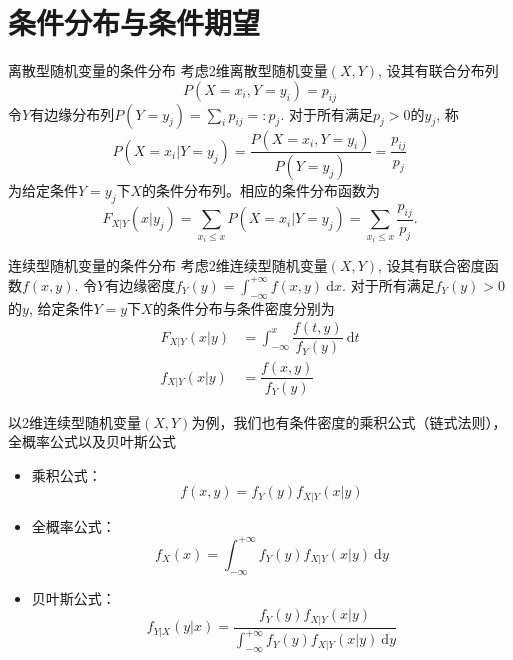 \section{条件分布与条件期望}


\begin{frame}

\begin{block}{离散型随机变量的条件分布}
考虑2维离散型随机变量$(X,Y)$, 设其有联合分布列
\[P(X=x_i, Y = y_i) = p_{ij}\]
令$Y$有边缘分布列$P(Y = y_j) = \sum\limits_{i} p_{ij} =: p_j$. 对于所有满足$p_j > 0$的$y_j$, 称
\[P(X = x_i | Y = y_j) = \dfrac{P(X=x_i, Y = y_i)}{P(Y = y_j)} = \dfrac{p_{ij}}{p_j}\]
为给定条件$Y=y_j$下$X$的条件分布列。相应的条件分布函数为
\[F_{X|Y}(x|y_j) = \sum\limits_{x_i \le x} P(X = x_i | Y = y_j) = \sum\limits_{x_i \le x} \dfrac{p_{ij}}{p_j}.\]
\end{block}

\end{frame}


\begin{frame}

\begin{block}{连续型随机变量的条件分布}
考虑2维连续型随机变量$(X,Y)$, 设其有联合密度函数$f(x,y)$. 令$Y$有边缘密度$f_Y(y) = \int_{-\infty}^{+\infty} f(x,y) ~ \mathrm{d}x$. 对于所有满足$f_Y(y) > 0$的$y$, 给定条件$Y=y$下$X$的条件分布与条件密度分别为
\begin{align*}
F_{X|Y}(x|y) & = \int_{-\infty}^x \dfrac{f(t,y)}{f_Y(y)} ~ \mathrm{d}t \\
f_{X|Y}(x|y) & = \dfrac{f(x,y)}{f_Y(y)}
\end{align*}
\end{block}

\end{frame}


\begin{frame}

以2维连续型随机变量$(X,Y)$为例，我们也有条件密度的乘积公式（链式法则），全概率公式以及贝叶斯公式
\begin{itemize}
\item 乘积公式：
\[f(x,y) = f_Y(y) f_{X|Y}(x|y)\]
\item 全概率公式：
\[f_X(x) = \int^{+\infty}_{-\infty} f_Y(y) f_{X|Y}(x|y) ~ \mathrm{d}y\]
\item 贝叶斯公式：
\[f_{Y|X}(y|x) = \dfrac{f_Y(y)f_{X|Y}(x|y)}{\int^{+\infty}_{-\infty} f_Y(y) f_{X|Y}(x|y) ~ \mathrm{d}y}\]
\end{itemize}

\end{frame}

